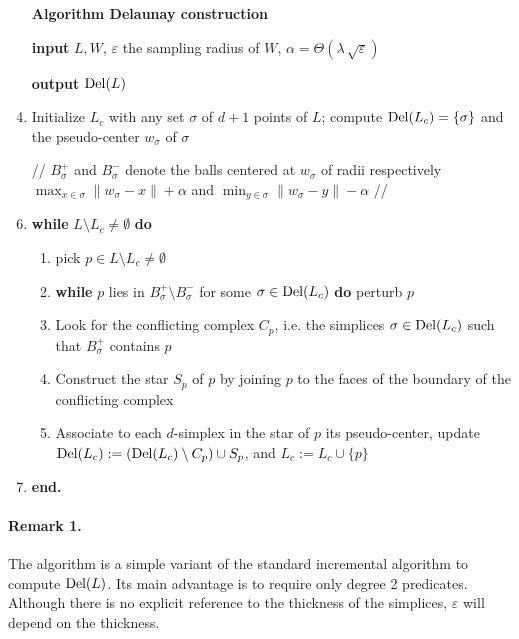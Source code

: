 \documentclass[11pt,a4paper]{article}
\newcommand{\e}{\varepsilon}
\newcommand{\del}{{\rm Del}}
\begin{document}
\begin{enumerate}
\item[{\bf Algorithm Delaunay construction}]
\item[{\bf input}] $L,W$, $\e$ the sampling radius of $W$, $\alpha =
  \Theta (\lambda\,\sqrt{\e})$
\item[{\bf output}] $\del (L)$
\item Initialize $L_c$ with any
  set $\sigma$ of $d+1$  points of $L$; compute $\del (L_c)=\{
\sigma\}$ and the
  pseudo-center $w_{\sigma}$ of $\sigma$

\item[//] $B_{\sigma}^+$ and $B_{\sigma}^-$ denote the balls centered
  at $w_{\sigma}$ of radii respectively $\max_{x\in \sigma} \|
  w_{\sigma}-x\| + \alpha$ and   $\min_{y\in \sigma} \|
  w_{\sigma}-y\| -\alpha$ //
\item {\bf while} $L\setminus L_c \neq \emptyset$ {\bf do}
 
 \begin{enumerate}
\item pick $p\in L \setminus L_c \neq \emptyset$
\item {\bf while}  $p$ lies in $B_{\sigma}^+\setminus B_{\sigma}^-$ for
  some $\sigma \in \del (L_c)$ {\bf do} perturb $p$

\item Look for the conflicting complex $C_p$, i.e. the
    simplices $\sigma \in \del (L_c)$  such that $B_{\sigma}^+$ contains
    $p$ 
    \item Construct the star $S_p$ of $p$ by joining $p$ to the faces of the
      boundary of the conflicting complex
          \item Associate to each $d$-simplex in the star of $p$ its
          pseudo-center,
update $\del (L_c):= \left( \del(L_c)\setminus C_p\right)  \cup S_p$, and $L_c:=L_c\cup \{ p\}$ 

\end{enumerate}
    \item {\bf end.}
    \end{enumerate}
    
\paragraph{Remark 1.} The algorithm is a simple variant of the standard
incremental algorithm to compute $\del (L)$. Its main advantage is to
require only degree 2 predicates. Although there is no explicit
reference to the thickness of the simplices, $\e$  will
depend on the thickness.
\end{document}
